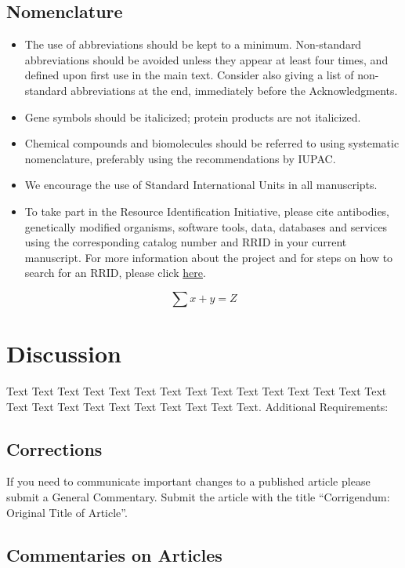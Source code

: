 \documentclass{frontiersSCNS} %
\begin{document}
\subsection{Nomenclature}
\begin{itemize}
\item The use of abbreviations should be kept to a minimum. Non-standard abbreviations should be avoided unless they appear at least four times, and defined upon first use in the main text. Consider also giving a list of non-standard abbreviations at the end, immediately before the Acknowledgments.
\item Gene symbols should be italicized; protein products are not italicized.
\item Chemical compounds and biomolecules should be referred to using systematic nomenclature, preferably using the recommendations by IUPAC.
\item We encourage the use of Standard International Units in all manuscripts.
\item To take part in the Resource Identification Initiative, please cite antibodies, genetically modified organisms, software tools, data, databases and services using the corresponding catalog number and RRID in your current manuscript. For more information about the project and for steps on how to search for an RRID, please click \href{http://www.frontiersin.org/files/pdf/letter_to_author.pdf}{here}.
\end{itemize}

\begin{equation}
\sum x+ y =Z\label{eq:01}
\end{equation}

\section{Discussion}

Text Text Text Text Text Text  Text Text Text Text Text Text Text Text Text  Text Text Text Text Text Text Text Text Text Text.
Additional Requirements:
\subsection{Corrections}

If you need to communicate important changes to a published article please submit a General Commentary. Submit the article with the title “Corrigendum: Original Title of Article”.

\subsection{Commentaries on Articles}
\end{document}

